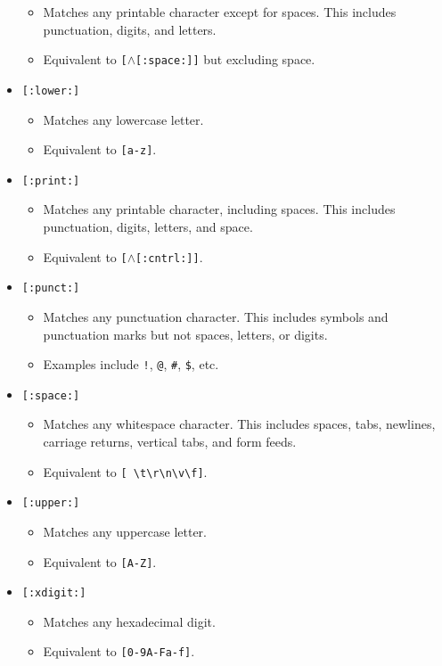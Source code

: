 \documentclass{report}
\begin{document}
\begin{itemize}
            \begin{itemize}
                \item Matches any printable character except for spaces. This includes punctuation, digits, and letters.
                \item Equivalent to \texttt{[$\land$[:space:]]} but excluding space.
            \end{itemize}
        \item \texttt{[:lower:]}
            \begin{itemize}
                \item Matches any lowercase letter.
                \item Equivalent to \texttt{[a-z]}.
            \end{itemize}
        \item \texttt{[:print:]}
            \begin{itemize}
                \item Matches any printable character, including spaces. This includes punctuation, digits, letters, and space.
                \item Equivalent to \texttt{[$\land$[:cntrl:]]}.
            \end{itemize}
        \item \texttt{[:punct:]}
            \begin{itemize}
                \item Matches any punctuation character. This includes symbols and punctuation marks but not spaces, letters, or digits.
                \item Examples include \texttt{!}, \texttt{@}, \texttt{\#}, \texttt{\$}, etc.
            \end{itemize}
        \item \texttt{[:space:]}
            \begin{itemize}
                \item Matches any whitespace character. This includes spaces, tabs, newlines, carriage returns, vertical tabs, and form feeds.
                \item Equivalent to \texttt{[ \textbackslash{}t\textbackslash{}r\textbackslash{}n\textbackslash{}v\textbackslash{}f]}.
            \end{itemize}
        \item \texttt{[:upper:]}
            \begin{itemize}
                \item Matches any uppercase letter.
                \item Equivalent to \texttt{[A-Z]}.
            \end{itemize}
        \item \texttt{[:xdigit:]}
            \begin{itemize}
                \item Matches any hexadecimal digit.
                \item Equivalent to \texttt{[0-9A-Fa-f]}.
            \end{itemize}
    \end{itemize}
    \pagebreak 
\end{document}
